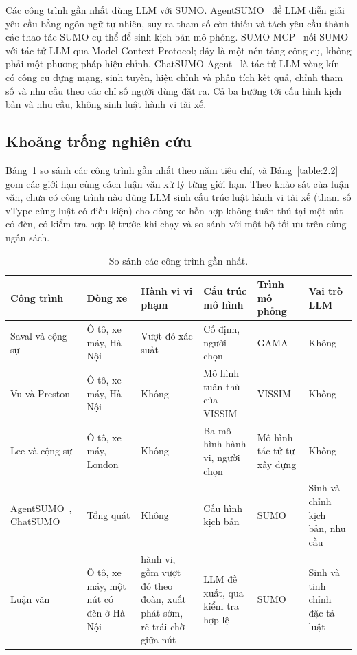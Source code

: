 \documentclass[../main.tex]{subfiles}
\begin{document}
Các công trình gần nhất dùng LLM với SUMO. AgentSUMO~\cite{jeong2025agentsumo} để LLM diễn giải yêu cầu bằng ngôn ngữ tự nhiên, suy ra tham số còn thiếu và tách yêu cầu thành các thao tác SUMO cụ thể để sinh kịch bản mô phỏng. SUMO-MCP~\cite{ye2025sumomcp} nối SUMO với tác tử LLM qua Model Context Protocol; đây là một nền tảng công cụ, không phải một phương pháp hiệu chỉnh. ChatSUMO Agent~\cite{li2026chatsumo} là tác tử LLM vòng kín có công cụ dựng mạng, sinh tuyến, hiệu chỉnh và phân tích kết quả, chỉnh tham số và nhu cầu theo các chỉ số người dùng đặt ra. Cả ba hướng tới cấu hình kịch bản và nhu cầu, không sinh luật hành vi tài xế.

\subsection{Khoảng trống nghiên cứu}
\label{subsection:2.1.5}

Bảng~\ref{table:2.compare} so sánh các công trình gần nhất theo năm tiêu chí, và Bảng~\ref{table:2.2} gom các giới hạn cùng cách luận văn xử lý từng giới hạn. Theo khảo sát của luận văn, chưa có công trình nào dùng LLM sinh cấu trúc luật hành vi tài xế (tham số vType cùng luật có điều kiện) cho dòng xe hỗn hợp không tuân thủ tại một nút có đèn, có kiểm tra hợp lệ trước khi chạy và so sánh với một bộ tối ưu trên cùng ngân sách.

\begin{table}[!htbp]
\centering
\small\setlength{\tabcolsep}{3pt}
\caption{So sánh các công trình gần nhất.}
\label{table:2.compare}
\begin{tabular}{|>{\raggedright\arraybackslash}p{2.9cm}|>{\raggedright\arraybackslash}p{2.2cm}|>{\raggedright\arraybackslash}p{2.2cm}|>{\raggedright\arraybackslash}p{2.5cm}|>{\raggedright\arraybackslash}p{1.9cm}|>{\raggedright\arraybackslash}p{1.9cm}|}
\hline
\textbf{Công trình} & \textbf{Dòng xe} & \textbf{Hành vi vi phạm} & \textbf{Cấu trúc mô hình} & \textbf{Trình mô phỏng} & \textbf{Vai trò LLM} \\ \hline
Saval và cộng sự~\cite{saval2023mixed} & Ô tô, xe máy, Hà Nội & Vượt đỏ xác suất & Cố định, người chọn & GAMA & Không \\ \hline
Vu và Preston~\cite{vu2023vissim} & Ô tô, xe máy, Hà Nội & Không & Mô hình tuân thủ của VISSIM & VISSIM & Không \\ \hline
Lee và cộng sự~\cite{lee2009motorcycles} & Ô tô, xe máy, London & Không & Ba mô hình hành vi, người chọn & Mô hình tác tử tự xây dựng & Không \\ \hline
AgentSUMO~\cite{jeong2025agentsumo}, ChatSUMO~\cite{li2026chatsumo} & Tổng quát & Không & Cấu hình kịch bản & SUMO & Sinh và chỉnh kịch bản, nhu cầu \\ \hline
Luận văn & Ô tô, xe máy, một nút có đèn ở Hà Nội & 10 hành vi, gồm vượt đỏ theo đoàn, xuất phát sớm, rẽ trái chờ giữa nút & LLM đề xuất, qua kiểm tra hợp lệ & SUMO & Sinh và tinh chỉnh đặc tả luật \\ \hline
\end{tabular}
\end{table}
\end{document}
